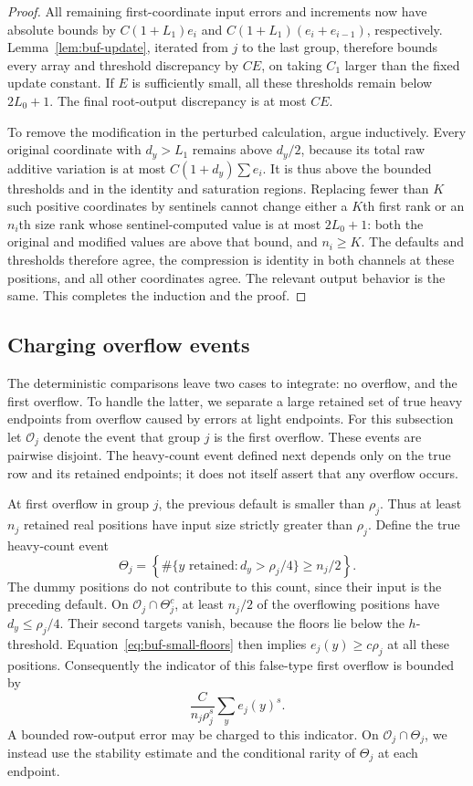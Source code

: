 \begin{proof}
All remaining first-coordinate input errors and increments now have
absolute bounds by $C(1+L_1)e_i$ and
$C(1+L_1)(e_i+e_{i-1})$, respectively.  Lemma~\ref{lem:buf-update},
iterated from $j$ to the last group, therefore bounds every array and
threshold discrepancy by $CE$, on taking $C_1$ larger than the fixed
update constant.  If $E$ is sufficiently small, all these thresholds
remain below $2L_0+1$.  The final root-output discrepancy is at most $CE$.

To remove the modification in the perturbed calculation, argue inductively.
Every original coordinate with $d_y>L_1$ remains above $d_y/2$, because
its total raw additive variation is at most $C(1+d_y)\sum e_i$.
It is thus above the bounded thresholds and in the identity and saturation
regions.  Replacing fewer than $K$ such positive coordinates by sentinels
cannot change either a $K$th first rank or an $n_i$th size rank whose
sentinel-computed value is at most $2L_0+1$: both the original and modified
values are above that bound, and $n_i\geq K$.
The defaults and thresholds therefore agree, the compression is identity
in both channels at these positions, and all other coordinates agree.
The relevant output behavior is the same.  This completes the induction
and the proof.
\end{proof}

\subsection{Charging overflow events}

The deterministic comparisons leave two cases to integrate: no overflow,
and the first overflow.  To handle the latter, we separate a large retained
set of true heavy endpoints from overflow caused by errors at light
endpoints.
For this subsection let $\mathcal O_j$ denote the event that group $j$
is the first overflow.  These events are pairwise disjoint.  The
heavy-count event defined next depends only on the true row and its
retained endpoints; it does not itself assert that any overflow occurs.

At first overflow in group $j$, the previous default is smaller than
$\rho_j$.  Thus at least $n_j$ retained real positions have input size
strictly greater than $\rho_j$.  Define the true heavy-count event
\[
 \Theta_j=\left\{\#\{y\text{ retained}:d_y>\rho_j/4\}\geq n_j/2\right\}.
\]
The dummy positions do not contribute to this count, since their input
is the preceding default.  On $\mathcal O_j\cap\Theta_j^c$, at least
$n_j/2$ of the overflowing positions have
$d_y\leq\rho_j/4$.  Their second targets vanish, because the floors lie
below the $h$-threshold.  Equation~\eqref{eq:buf-small-floors} then implies
$e_j(y)\geq c\rho_j$ at all these positions.  Consequently the indicator
of this false-type first overflow is bounded by
\begin{equation}
 \frac{C}{n_j\rho_j^s}\sum_y e_j(y)^s.
 \label{eq:buf-false-charge}
\end{equation}
A bounded row-output error may be charged to this indicator.
On $\mathcal O_j\cap\Theta_j$, we instead use the stability estimate
and the conditional rarity of $\Theta_j$ at each endpoint.

